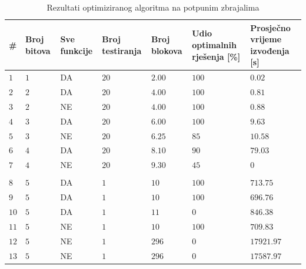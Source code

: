 \documentclass[times, utf8, diplomski]{fer}
\begin{document}
\begin{table}
	\centering
	\caption{Rezultati optimiziranog algoritma na potpunim zbrajalima}
	\label{tab:optimized-results}
	\begin{tabular}{
			|>{\centering\arraybackslash}m{4mm}
			|>{\centering\arraybackslash}m{18mm}
			|>{\centering\arraybackslash}m{18mm}
			|>{\centering\arraybackslash}m{18mm}
			|>{\centering\arraybackslash}m{18mm}
			|>{\centering\arraybackslash}m{20mm}
			|>{\centering\arraybackslash}m{20mm}|}
		\hline
		\textbf{\#}
		& \textbf{Broj \linebreak bitova}
		& \textbf{Sve \linebreak funkcije}
		& \textbf{Broj \linebreak testiranja}
		& \textbf{Broj \linebreak blokova}
		& \textbf{Udio \linebreak optimalnih \linebreak rješenja [\%]}
		& \textbf{Prosječno vrijeme izvođenja [s]} \\ \hline
		
		$1$		& $1$	& DA	& $20$		& $2.00$	& $100$		& $0.02$	\\ \hline
		$2$		& $2$	& DA	& $20$		& $4.00$	& $100$		& $0.81$	\\ \hline
		$3$		& $2$	& NE	& $20$		& $4.00$	& $100$		& $0.88$	\\ \hline
		$4$		& $3$	& DA	& $20$		& $6.00$	& $100$		& $9.63$	\\ \hline
		$5$		& $3$	& NE	& $20$		& $6.25$	& $85$		& $10.58$	\\ \hline
		$6$		& $4$	& DA	& $20$		& $8.10$	& $90$		& $79.03$	\\ \hline
		$7$		& $4$	& NE	& $20$		& $9.30$	& $45$		& $0$	\\ \hline
		\multicolumn{7}{|c|}{\textbf{Pojedinačni rezultati}} \\ \hline
		$8$		& $5$	& DA	& $1$		& $10$		& $100$		& $713.75$		\\ \hline
		$9$		& $5$	& DA	& $1$		& $10$		& $100$		& $696.76$		\\ \hline
		$10$	& $5$	& DA	& $1$		& $11$		& $0$		& $846.38$		\\ \hline
		$11$	& $5$	& NE	& $1$		& $10$		& $100$		& $709.83$		\\ \hline
		$12$	& $5$	& NE	& $1$		& $296$		& $0$		& $17921.97$	\\ \hline
		$13$	& $5$	& NE	& $1$		& $296$		& $0$		& $17587.97$	\\ \hline
		
	\end{tabular}
\end{table}
\end{document}
